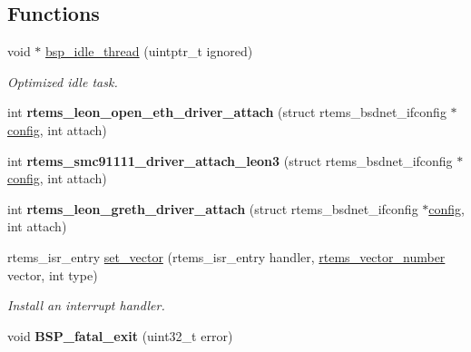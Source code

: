 \subsection*{Functions}
\begin{DoxyCompactItemize}
\item 
void $\ast$ \mbox{\hyperlink{group__RTEMSBSPsSPARCLEON3_ga301be7085b80c41a9c5887247003c662}{bsp\+\_\+idle\+\_\+thread}} (uintptr\+\_\+t ignored)
\begin{DoxyCompactList}\small\item\em Optimized idle task. \end{DoxyCompactList}\item 
\mbox{\label{group__RTEMSBSPsSPARCLEON3_gaee4494e41243f51816abe46d562111d8}} 
int {\bfseries rtems\+\_\+leon\+\_\+open\+\_\+eth\+\_\+driver\+\_\+attach} (struct rtems\+\_\+bsdnet\+\_\+ifconfig $\ast$\mbox{\hyperlink{structconfig__s}{config}}, int attach)
\item 
\mbox{\label{group__RTEMSBSPsSPARCLEON3_gaefd6b532d8bf62c56114a7eae5c4f4ec}} 
int {\bfseries rtems\+\_\+smc91111\+\_\+driver\+\_\+attach\+\_\+leon3} (struct rtems\+\_\+bsdnet\+\_\+ifconfig $\ast$\mbox{\hyperlink{structconfig__s}{config}}, int attach)
\item 
\mbox{\label{group__RTEMSBSPsSPARCLEON3_gae03590c26cd87b87151dffc04150223c}} 
int {\bfseries rtems\+\_\+leon\+\_\+greth\+\_\+driver\+\_\+attach} (struct rtems\+\_\+bsdnet\+\_\+ifconfig $\ast$\mbox{\hyperlink{structconfig__s}{config}}, int attach)
\item 
rtems\+\_\+isr\+\_\+entry \mbox{\hyperlink{group__RTEMSBSPsSPARCLEON3_gab3388042c56b34c40be81fd5f028d97e}{set\+\_\+vector}} (rtems\+\_\+isr\+\_\+entry handler, \mbox{\hyperlink{group__ClassicINTR_ga3e434c197d99f128e78cae4d9358bd8b}{rtems\+\_\+vector\+\_\+number}} vector, int type)
\begin{DoxyCompactList}\small\item\em Install an interrupt handler. \end{DoxyCompactList}\item 
\mbox{\label{group__RTEMSBSPsSPARCLEON3_ga9806dc4ebe8d5e4501ace29eb97a8c84}} 
void {\bfseries B\+S\+P\+\_\+fatal\+\_\+exit} (uint32\+\_\+t error)
\item 

\end{DoxyCompactItemize}
